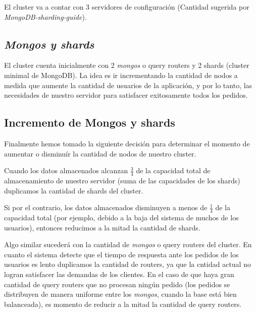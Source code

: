 El cluster va a contar con 3 servidores de configuración (Cantidad sugerida por \emph{MongoDB-sharding-guide}).

\subsection{\emph{Mongos y shards}}

El cluster cuenta inicialmente con 2 \emph{mongos} o query routers y 2 shards (cluster minimal de MongoDB). La idea es
ir incrementando la cantidad de nodos a medida que aumente la cantidad de usuarios de
la aplicación, y por lo tanto, las necesidades de nuestro servidor para satisfacer exitosamente todos los pedidos.

\subsection{Incremento de Mongos y shards}

Finalmente hemos tomado la siguiente decisión para determinar el momento de aumentar o disminuír la cantidad de nodos
de nuestro cluster.

Cuando los datos almacenados alcanzan $\frac{3}{4}$ de 
la capacidad total de almacenamiento de nuestro servidor (suma de las capacidades de los shards) 
duplicamos la cantidad de shards del cluster.

Si por el contrario, los datos almacenados disminuyen a menos de $\frac{1}{4}$ de la capacidad total (por ejemplo,
debido a la baja del sistema de muchos de los usuarios), entonces reducimos a la mitad la cantidad de shards.

Algo similar sucederá con la cantidad de \emph{mongos} o query routers del cluster. En cuanto el sistema detecte que
el tiempo de respuesta ante los pedidos de los usuarios es lento duplicamos la cantidad de routers, ya que la 
cntidad actual no logran satisfacer las demandas de los clientes. En el caso de que haya gran cantidad de query routers
que no procesan ningún pedido (los pedidos se distribuyen de manera uniforme entre los \emph{mongos}, cuando
la base está bien balanceada), es momento de reducir a la mitad la cantidad de query routers.

